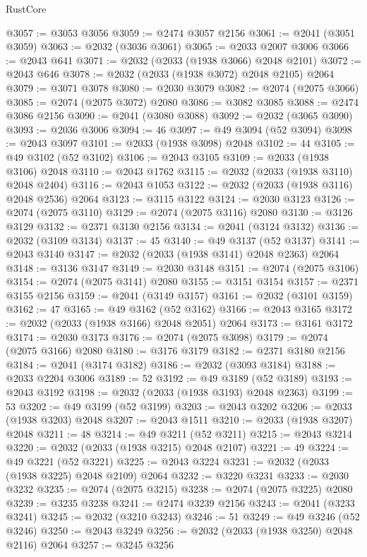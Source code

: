 \begin{lexlean}{RustCore}
\begin{coremodule}
@3057 := @3053 @3056
@3059 := @2474 @3057 @2156
@3061 := @2041 (@3051 @3059)
@3063 := @2032 (@3036 @3061)
@3065 := @2033 @2007 @3006
@3066 := @2043 @641
@3071 := @2032 (@2033 (@1938 @3066) @2048 @2101)
@3072 := @2043 @646
@3078 := @2032 (@2033 (@1938 @3072) @2048 @2105) @2064
@3079 := @3071 @3078
@3080 := @2030 @3079
@3082 := @2074 (@2075 @3066)
@3085 := @2074 (@2075 @3072) @2080
@3086 := @3082 @3085
@3088 := @2474 @3086 @2156
@3090 := @2041 (@3080 @3088)
@3092 := @2032 (@3065 @3090)
@3093 := @2036 @3006
@3094 := 46
@3097 := @49 @3094 (@52 @3094)
@3098 := @2043 @3097
@3101 := @2033 (@1938 @3098) @2048
@3102 := 44
@3105 := @49 @3102 (@52 @3102)
@3106 := @2043 @3105
@3109 := @2033 (@1938 @3106) @2048
@3110 := @2043 @1762
@3115 := @2032 (@2033 (@1938 @3110) @2048 @2404)
@3116 := @2043 @1053
@3122 := @2032 (@2033 (@1938 @3116) @2048 @2536) @2064
@3123 := @3115 @3122
@3124 := @2030 @3123
@3126 := @2074 (@2075 @3110)
@3129 := @2074 (@2075 @3116) @2080
@3130 := @3126 @3129
@3132 := @2371 @3130 @2156
@3134 := @2041 (@3124 @3132)
@3136 := @2032 (@3109 @3134)
@3137 := 45
@3140 := @49 @3137 (@52 @3137)
@3141 := @2043 @3140
@3147 := @2032 (@2033 (@1938 @3141) @2048 @2363) @2064
@3148 := @3136 @3147
@3149 := @2030 @3148
@3151 := @2074 (@2075 @3106)
@3154 := @2074 (@2075 @3141) @2080
@3155 := @3151 @3154
@3157 := @2371 @3155 @2156
@3159 := @2041 (@3149 @3157)
@3161 := @2032 (@3101 @3159)
@3162 := 47
@3165 := @49 @3162 (@52 @3162)
@3166 := @2043 @3165
@3172 := @2032 (@2033 (@1938 @3166) @2048 @2051) @2064
@3173 := @3161 @3172
@3174 := @2030 @3173
@3176 := @2074 (@2075 @3098)
@3179 := @2074 (@2075 @3166) @2080
@3180 := @3176 @3179
@3182 := @2371 @3180 @2156
@3184 := @2041 (@3174 @3182)
@3186 := @2032 (@3093 @3184)
@3188 := @2033 @2204 @3006
@3189 := 52
@3192 := @49 @3189 (@52 @3189)
@3193 := @2043 @3192
@3198 := @2032 (@2033 (@1938 @3193) @2048 @2363)
@3199 := 53
@3202 := @49 @3199 (@52 @3199)
@3203 := @2043 @3202
@3206 := @2033 (@1938 @3203) @2048
@3207 := @2043 @1511
@3210 := @2033 (@1938 @3207) @2048
@3211 := 48
@3214 := @49 @3211 (@52 @3211)
@3215 := @2043 @3214
@3220 := @2032 (@2033 (@1938 @3215) @2048 @2107)
@3221 := 49
@3224 := @49 @3221 (@52 @3221)
@3225 := @2043 @3224
@3231 := @2032 (@2033 (@1938 @3225) @2048 @2109) @2064
@3232 := @3220 @3231
@3233 := @2030 @3232
@3235 := @2074 (@2075 @3215)
@3238 := @2074 (@2075 @3225) @2080
@3239 := @3235 @3238
@3241 := @2474 @3239 @2156
@3243 := @2041 (@3233 @3241)
@3245 := @2032 (@3210 @3243)
@3246 := 51
@3249 := @49 @3246 (@52 @3246)
@3250 := @2043 @3249
@3256 := @2032 (@2033 (@1938 @3250) @2048 @2116) @2064
@3257 := @3245 @3256

\end{coremodule}
\end{lexlean}

